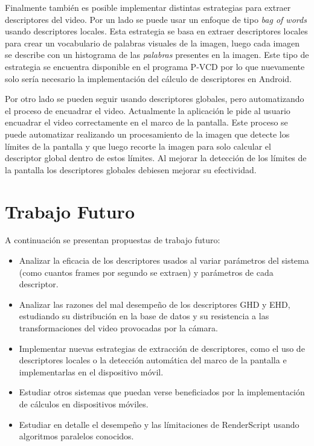 Finalmente también es posible implementar distintas estrategias para extraer descriptores del video. Por un lado se puede usar un enfoque de tipo \emph{bag of words} usando descriptores locales. Esta estrategia se basa en extraer descriptores locales para crear un vocabulario de palabras visuales de la imagen, luego cada imagen se describe con un histograma de las \emph{palabras} presentes en la imagen. Este tipo de estrategia se encuentra disponible en el programa P-VCD por lo que nuevamente solo sería necesario la implementación del cálculo de descriptores en Android.

Por otro lado se pueden seguir usando descriptores globales, pero automatizando el proceso de encuadrar el video. Actualmente la aplicación le pide al usuario encuadrar el video correctamente en el marco de la pantalla. Este proceso se puede automatizar realizando un procesamiento de la imagen que detecte los límites de la pantalla y que luego recorte la imagen para solo calcular el descriptor global dentro de estos límites. Al mejorar la detección de los límites de la pantalla los descriptores globales debiesen mejorar su efectividad.

\section{Trabajo Futuro}

A continuación se presentan propuestas de trabajo futuro:

\begin{itemize}
\item Analizar la eficacia de los descriptores usados al variar parámetros del sistema (como cuantos frames por segundo se extraen) y parámetros de cada descriptor.
\item Analizar las razones del mal desempeño de los descriptores GHD y EHD, estudiando su distribución en la base de datos y su resistencia a las transformaciones del video provocadas por la cámara.
\item Implementar nuevas estrategias de extracción de descriptores, como el uso de descriptores locales o la detección automática del marco de la pantalla e implementarlas en el dispositivo móvil.
\item Estudiar otros sistemas que puedan verse beneficiados por la implementación de cálculos en dispositivos móviles.
\item Estudiar en detalle el desempeño y las límitaciones de RenderScript usando algoritmos paralelos conocidos.
\end{itemize}

